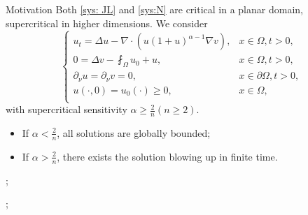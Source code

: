 \begin{frame}{Motivation}
Both \eqref{sys: JL} and \eqref{sys:N} are critical in a planar domain, supercritical in higher dimensions. We consider 
\begin{equation}\label{sys: ks-nonlinear-sensitivity}
	\left\{
	\begin{array}{ll}
		u_t = \Delta u - \nabla\cdot (u(1+u)^{\alpha - 1}\nabla v), & x\in\Omega, t > 0,\\
		0 = \Delta v - \fint_\Omega u_0 + u, & x\in\Omega, t > 0,\\
		\partial_\nu u = \partial_\nu v = 0, & x\in\partial\Omega, t > 0,\\
		u(\cdot, 0) = u_0(\cdot)\geqslant0, &x\in\Omega,\\
	\end{array}
	\right.
	\tag{$\bigstar$}
\end{equation}
with supercritical sensitivity $\alpha\geqslant\frac2n(n\geqslant2)$.
\begin{itemize}
    \item If $\alpha<\frac2n$, all solutions are globally bounded;
    \item If $\alpha>\frac2n$, there exists the solution blowing up in finite time. 
\end{itemize}

;

; 



\end{frame}

